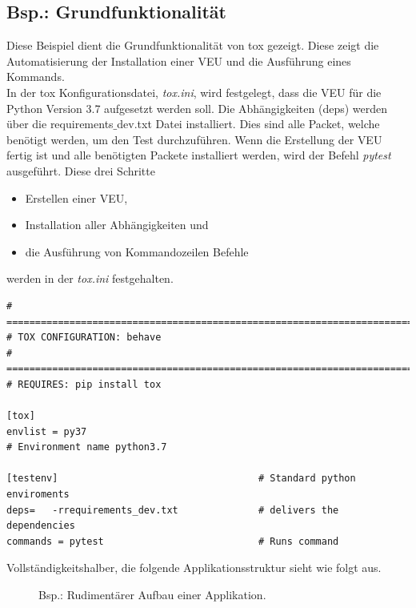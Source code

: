 \subsection{Bsp.: Grundfunktionalität}
Diese Beispiel dient die Grundfunktionalität von tox gezeigt. Diese zeigt die Automatisierung der Installation einer \gls{VEU} und die Ausführung eines Kommands.\\

In der tox Konfigurationsdatei, \textit{tox.ini}, wird festgelegt, dass die \gls{VEU} für die Python Version 3.7 aufgesetzt werden soll. Die Abhängigkeiten (deps) werden über die requirements$\_$dev.txt Datei installiert. Dies sind alle Packet, welche benötigt werden, um den Test durchzuführen. Wenn die Erstellung der \gls{VEU} fertig ist und alle benötigten Packete installiert werden, wird der Befehl \textit{pytest} ausgeführt. Diese drei Schritte
\begin{itemize}
	\item Erstellen einer \gls{VEU},
	\item Installation aller Abhängigkeiten und 
	\item die Ausführung von Kommandozeilen Befehle
\end{itemize}
werden in der \textit{tox.ini} festgehalten.

\begin{lstlisting}[style=Config]
# ============================================================================
# TOX CONFIGURATION: behave
# ============================================================================
# REQUIRES: pip install tox

[tox]
envlist = py37
# Environment name python3.7

[testenv] 									# Standard python enviroments
deps=	-rrequirements_dev.txt 				# delivers the dependencies
commands = pytest							# Runs command
\end{lstlisting}


Vollständigkeitshalber, die folgende Applikationsstruktur sieht wie folgt aus.
\begin{figure}[h]
	\centering
	\caption{Bsp.: Rudimentärer Aufbau einer Applikation.}
\end{figure}

